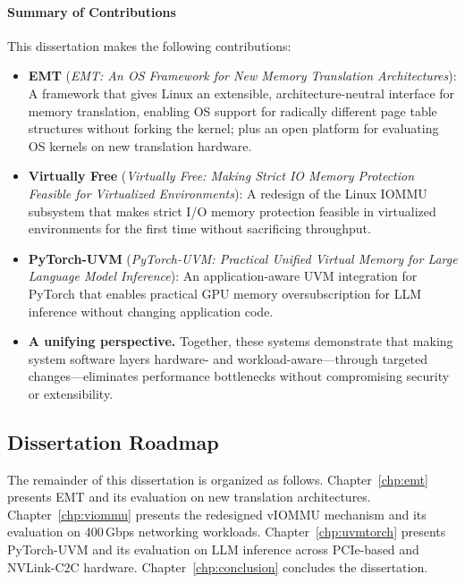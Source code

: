 \paragraph{Summary of Contributions}

This dissertation makes the following contributions:

\begin{itemize}
    \item \textbf{EMT} (\emph{EMT: An OS Framework for New Memory Translation Architectures}):
        A framework that gives Linux an extensible, architecture-neutral
        interface for memory translation, enabling OS support for radically different
        page table structures without forking the kernel; plus an open platform for
        evaluating OS kernels on new translation hardware.

    \item \textbf{Virtually Free} (\emph{Virtually Free: Making Strict IO Memory Protection
        Feasible for Virtualized Environments}):
        A redesign of the Linux IOMMU subsystem that
        makes strict I/O memory protection feasible in virtualized environments for
        the first time without sacrificing throughput.

    \item \textbf{PyTorch-UVM} (\emph{PyTorch-UVM: Practical Unified Virtual Memory for
        Large Language Model Inference}):
        An application-aware UVM integration for PyTorch that
        enables practical GPU memory oversubscription for LLM inference without changing application code.

    \item \textbf{A unifying perspective.} 
        Together, these systems demonstrate that making system software layers hardware-
        and workload-aware---through targeted changes---eliminates performance bottlenecks
        without compromising security or extensibility.
\end{itemize}

\subsection{Dissertation Roadmap}

The remainder of this dissertation is organized as follows.
Chapter~\ref{chp:emt} presents EMT and its evaluation on new translation architectures.
Chapter~\ref{chp:viommu} presents the redesigned vIOMMU mechanism and its evaluation
on 400\,Gbps networking workloads.
Chapter~\ref{chp:uvmtorch} presents PyTorch-UVM and its evaluation on LLM inference across
PCIe-based and NVLink-C2C hardware.
Chapter~\ref{chp:conclusion} concludes the dissertation.
